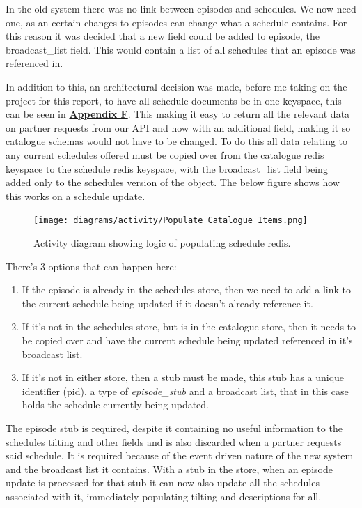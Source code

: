   \vspace{0.2cm}
  In the old system there was no link between episodes and schedules. We now need one, as an certain changes to episodes can change what a schedule 
  contains. For this reason it was decided that a new field could be added to episode, the broadcast\_list field. This would contain a list of all 
  schedules that an episode was referenced in.

  In addition to this, an architectural decision was made, before me taking on the project for this report, to have all schedule documents be in one keyspace,
  this can be seen in \hyperref[sec:AppendixF]{\textbf{Appendix F}}. 
  This making it easy to return all the relevant data on partner requests from our API and now with an additional field, making it so catalogue schemas would 
  not have to be changed. To do this all data relating to any current schedules offered must be copied over from the catalogue redis keyspace to the schedule
  redis keyspace, with the broadcast\_list field being added only to the schedules version of the object. The below figure shows how this works on a
  schedule update.

  \begin{figure}[H]
    \centering
    \texttt{[image: diagrams/activity/Populate Catalogue Items.png]}
    \caption{Activity diagram showing logic of populating schedule redis.}
    \label{fig:scheduleRedisPopulationActivity}
  \end{figure}

  There's 3 options that can happen here:
  \begin{enumerate}
    \item If the episode is already in the schedules store, then we need to add a link to the current schedule being updated if it doesn't
    already reference it. 
    \item If it's not in the schedules store, but is in the catalogue store, then it needs to be copied over and have the current schedule
    being updated referenced in it's broadcast list.
    \item If it's not in either store, then a stub must be made, this stub has a unique identifier (pid), a type of \emph{episode\_stub} and 
    a broadcast list, that in this case holds the schedule currently being updated.
  \end{enumerate}

  The episode stub is required, despite it containing no useful information to the schedules tilting and other fields and is also discarded when a
  partner requests said schedule. It is required because of the event driven nature of the new system and the broadcast list it contains. With a stub in 
  the store, when an episode update is processed for that stub it can now also update all the schedules associated with it, immediately populating tilting
  and descriptions for all.

